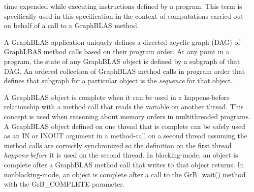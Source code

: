 time expended while executing instructions defined by a program.
This term is specifically used in this specification in the context of computations 
carried out on behalf of a call to a GraphBLAS method.


 A GraphBLAS application uniquely defines a directed
acyclic graph (DAG) of GraphLBAS method calls based on their program order.  
At any point in a program, the state of any GraphBLAS object is defined by a 
subgraph of that DAG.  An ordered collection of GraphBLAS method calls in program order that
defines that subgraph for a particular object is the \emph{sequence} for that object.


  A GraphBLAS object is complete when it can be used in a happens-before relationship
with a method call that reads the variable on another thread.  This concept is used
when reasoning about memory orders in multithreaded programs.  A GraphBLAS object defined on one thread 
that is complete can be safely used as an {\sf IN} or {\sf INOUT} argument
in a method-call on a second thread assuming the method calls are correctly synchronized so the definition on 
the first thread \emph{happens-before} it is used on the second thread.  In blocking-mode, an object is 
complete after a GraphBLAS method call that writes to that object returns.   In nonblocking-mode, an object is complete 
after a call to the {\sf GrB\_wait()} method with the {\sf GrB\_COMPLETE} parameter.

